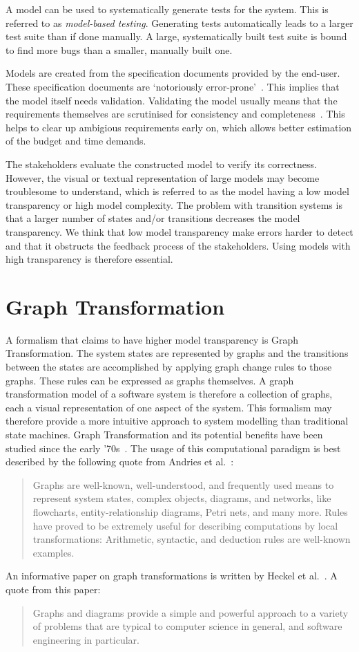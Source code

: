 A model can be used to systematically generate tests for the system. This is referred to as \textit{model-based testing}. Generating tests automatically leads to a larger test suite than if done manually. A large, systematically built test suite is bound to find more bugs than a smaller, manually built one.

Models are created from the specification documents provided by the end-user. These specification documents are `notoriously error-prone'~\cite{McCabe:testing}. This implies that the model itself needs validation. Validating the model usually means that the requirements themselves are scrutinised for consistency and completeness~\cite{Utting:MBTTaxonomy}. This helps to clear up ambigious requirements early on, which allows better estimation of the budget and time demands.

The stakeholders evaluate the constructed model to verify its correctness. However, the visual or textual representation of large models may become troublesome to understand, which is referred to as the model having a low model transparency or high model complexity. The problem with transition systems is that a larger number of states and/or transitions decreases the model transparency. We think that low model transparency make errors harder to detect and that it obstructs the feedback process of the stakeholders. Using models with high transparency is therefore essential.

\section{Graph Transformation}
A formalism that claims to have higher model transparency is Graph Transformation. The system states are represented by graphs and the transitions between the states are accomplished by applying graph change rules to those graphs. These rules can be expressed as graphs themselves. A graph transformation model of a software system is therefore a collection of graphs, each a visual representation of one aspect of the system. This formalism may therefore provide a more intuitive approach to system modelling than traditional state machines. Graph Transformation and its potential benefits have been studied since the early '70s~\cite{Pratt1971}. The usage of this computational paradigm is best described by the following quote from Andries et al.~\cite{Andries1999}: \begin{quote}Graphs are well-known, well-understood, and frequently used means to represent system states, complex objects, diagrams, and networks, like flowcharts, entity-relationship diagrams, Petri nets, and many more. Rules have proved to be extremely useful for describing computations by local transformations: Arithmetic, syntactic, and deduction rules are well-known examples.\end{quote} An informative paper on graph transformations is written by Heckel et al.~\cite{Heckel2006187}. A quote from this paper: \begin{quote}Graphs and diagrams provide a simple and powerful approach to a variety of problems that are typical to computer science in general, and software engineering in particular.\end{quote}

